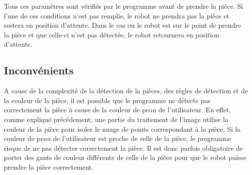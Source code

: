 Tous ces paramètres sont vérifiés par le programme avant de prendre la pièce. Si l'une de ces conditions n'est pas remplie, le robot ne prendra pas la pièce et restera en position d'attente. Dans le cas ou le robot est sur le point de prendre la pièce et que celle-ci n'est pas détectée, le robot retournera en position d'attente.

\subsection{Inconvénients}

A cause de la complexité de la détection de la pièces, des règles de détection et de la couleur de la pièce, il est possible que le programme ne détecte pas correctement la pièce à cause de la couleur de peau de l'utilisateur. En effet, comme expliqué précédement, une partie du traitement de l'image utilise la couleur de la pièce pour isoler le nuage de points correspondant à la pièce. Si la couleur de peau de l'utilisateur est proche de celle de la pièce, le programme risque de ne pas détecter correctement la pièce. Il est donc parfois obligatoire de porter des gants de couleur différente de celle de la pièce pour que le robot puisse prendre la pièce correctement.

